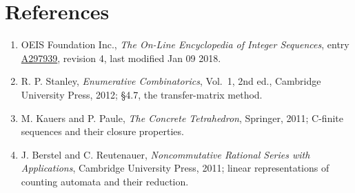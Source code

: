 \documentclass[11pt]{article}
\theoremstyle{definition}
\begin{document}
\section{References}

\begin{enumerate}

\item OEIS Foundation Inc., \emph{The On-Line Encyclopedia of Integer Sequences}, entry \href{https://oeis.org/A297939}{A297939}, revision 4, last modified Jan 09 2018.

\item R. P. Stanley, \emph{Enumerative Combinatorics}, Vol.~1, 2nd ed., Cambridge University Press, 2012; \S4.7, the transfer-matrix method.

\item M. Kauers and P. Paule, \emph{The Concrete Tetrahedron}, Springer, 2011; C-finite sequences and their closure properties.

\item J. Berstel and C. Reutenauer, \emph{Noncommutative Rational Series with Applications}, Cambridge University Press, 2011; linear representations of counting automata and their reduction.

\end{enumerate}
\end{document}
